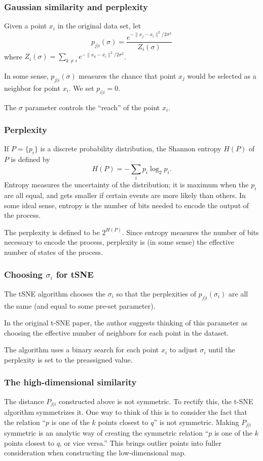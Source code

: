 \documentclass{beamer}
\begin{document}
\begin{frame}
  \frametitle{Gaussian similarity and perplexity}
  Given a point $x_i$ in the original data set, let
  $$
  p_{j|i}(\sigma)=\frac{e^{-\|x_j-x_i\|^2/2\sigma^2}}{Z_i(\sigma)}
  $$
  where $Z_i(\sigma)=\sum_{k\not=i}e^{-\|x_k-x_i\|^2/2\sigma^2}$.
  \bigskip\noindent

  In some sense, $p_{j|i}(\sigma)$ measures the chance that point $x_j$ would be selected as a neighbor for point $x_i$.  We set $p_{i|i}=0$.
  \bigskip\noindent

  The $\sigma$ parameter controls the ``reach'' of the point $x_i$.
  
\end{frame}
\begin{frame}
  \frametitle{Perplexity}
  If $P=\{p_i\}$ is a discrete probability distribution, the Shannon entropy $H(P)$ of $P$ is defined by
  $$
  H(P)=-\sum_{i} p_i\log_2 p_i.
  $$
  Entropy measures the uncertainty of the distribution; it is maximum when the $p_i$ are all equal, and gets smaller if certain events are more likely than others. In some ideal sense, entropy is the number of bits needed to encode the output of the process.
  \bigskip\noindent

  The perplexity is defined to be $2^{H(P)}$.  Since entropy measures the number of bits necessary to encode the process, perplexity is (in some sense) the
  effective number of states of the process.
\end{frame}
\begin{frame}
  \frametitle{Choosing $\sigma_i$ for tSNE}
  The tSNE algorithm chooses the $\sigma_i$ so that the perplexities of $p_{j|i}(\sigma_i)$ are all the same (and equal to some pre-set parameter).
  \bigskip\noindent

  In the original t-SNE paper, the author suggests thinking of this parameter as choosing the effective number of neighbors for each point in the
  dataset.

  The algorithm uses a binary search for each point $x_i$ to adjust $\sigma_i$ until the perplexity is set to the preassigned value.
\end{frame}
\begin{frame}
  \frametitle{The high-dimensional similarity}
  The distance $P_{j|i}$ constructed above is not symmetric.  To rectify this, the t-SNE algorithm symmetrizes it.
\bigskip\noindent
  One way to think of this is to consider the fact that the relation ``$p$ is one of the $k$ points closest to $q$'' is not symmetric.
  Making $P_{j|i}$ symmetric is an analytic way of creating the symmetric relation ``$p$ is one of the $k$ points closest to $q$, or vice versa.''
  \bigskip\noindent
  This brings outlier points into fuller consideration when constructing the low-dimensional map.
\end{frame}
\end{document}
